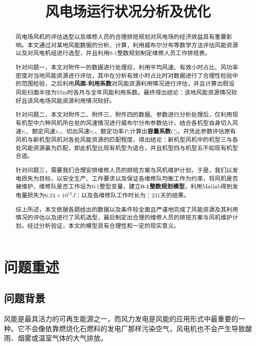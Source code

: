\documentclass[withoutpreface,bwprint]{cumcmthesis} %
\title{风电场运行状况分析及优化}
\begin{document}
	\maketitle
	\begin{abstract}
		风电场风机的评估选型以及维修人员的合理排班规划对风电场的经济效益具有重要影响。本文通过对某地风能数据的分析、计算，利用威布尔分布等数学方法评估风能资源以及对风电机组进行选型，并且利用0-1整数规划制定维修人员工作排班表。\par
		针对问题一，本文对附件一的数据进行处理后，利用平均风速、有效小时占比、风功率密度对当地风能资源进行评估，其中在分析有效小时占比时对数据进行了合理性检验中的范围检验，之后利用\textbf{风面-利用系数}对风能资源利用情况进行评估，并且计算出假设风轮扫面半径为55m时各月与全年风能利用系数。最终得出结论：该地风能资源情况较好且该风电场风能资源利用情况较好。\par
		针对问题二，本文对附件二、附件三、附件四的数据、参数进行分析处理后，仅利用现有机型中六种风机所在处的风速情况进行威布尔分布参数估计，结合各机型自身切入风速$v_i$、额定风速$v_r$、切出风速$v_c$、额定功率$P_r$计算出\textbf{容量系数$C_f$}，并凭此参数评估原有风机与新机型风机对各处风能资源的匹配程度，得出结论：新机型风机中的机型三与各处风能资源最为匹配，即此机型比现有机型为适合，并且机型四与机型五不如现有机型合适。\par
		针对问题三，需要我们合理安排维修人员的排班方案与风机维护计划，于是，我们以发电损失为目标，以安全生产、工作要求以及保证各维修队均衡工作为约束，将风机是否被维护、维修队是否工作设为0-1整型变量，建立\textbf{0-1整数规划模型}，利用Matlab得到发电量损失为$6.24×10^{12}J$：以及各维修队工作时长为：231天的结果。\par
		综上所述，本文依据各题给出的数据以及条件较全面且严谨地完成了风能资源及其利用情况的评估以及进行了风机选型，最后制定出合理的维修人员的排班方案与风机维护计划。经过分析验证，本文的模型具有合理性和一定的现实意义。
	\end{abstract}
	\section{问题重述}
	\subsection{问题背景}
	风能是最具活力的可再生能源之一，而风力发电是风能的应用形式中最重要的一种。它不会像依靠燃烧化石燃料的发电厂那样污染空气，风电机也不会产生导致酸雨、烟雾或温室气体的大气排放。
	
	
	
\end{document}
